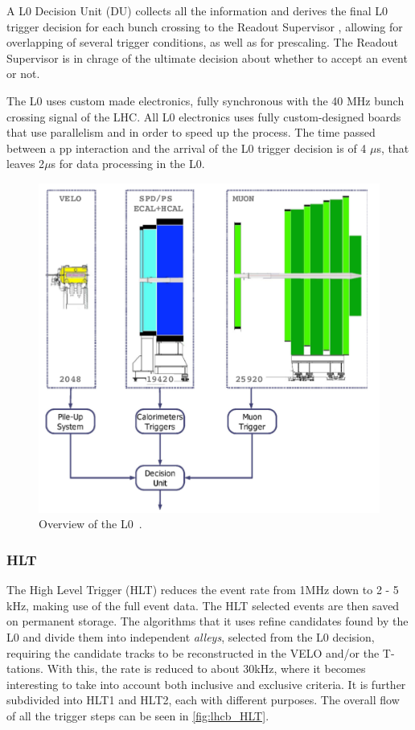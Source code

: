 A L0 Decision Unit (DU) collects all the information and derives the final L0 trigger decision for each bunch crossing to the Readout Supervisor , allowing for overlapping of several trigger conditions, as well as for prescaling. The Readout Supervisor is in chrage of the ultimate decision about whether to accept an event or not. 

The L0 uses custom made electronics, fully synchronous with the 40 MHz bunch crossing signal of the LHC. All L0 electronics uses fully custom-designed boards that use parallelism and  in order to speed up the process. The time passed between a pp interaction and the arrival of the L0 trigger decision is of 4 $\mu$s, that leaves 2$\mu$s for data processing in the L0.

\begin{figure} [htb!]
\begin{center}
\includegraphics[scale=0.7]{figs/L0.png}
\caption{Overview of the L0~\cite{Alves:2008zz}.\label{fig:lhcb_L0}}
\end{center}
\end{figure}



\subsubsection{HLT} 
The High Level Trigger (HLT) reduces the event rate from 1MHz down to 2 - 5 kHz, making use of the full event data. The HLT selected events are then saved on permanent storage. The algorithms that it uses refine candidates found by the L0 and divide them into independent \textit{alleys}, selected from the L0 decision, requiring the candidate tracks to be reconstructed in the VELO and/or the T-tations. With this, the rate is reduced to about 30kHz, where it becomes interesting to take into account both inclusive and exclusive criteria. It is further subdivided into HLT1 and HLT2, each with different purposes. The overall flow of all the trigger steps can be seen in \ref{fig:lhcb_HLT}. 


